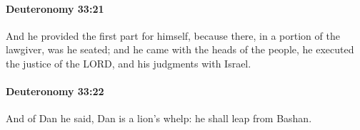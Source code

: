 		\paragraph{Deuteronomy 33:21} %
			\label{DEUTERONOMY-33-21}

			And he provided the first part for himself, because there, in a portion of the lawgiver, was he seated; and he came with the heads of the people, he executed the justice of the LORD, and his judgments with Israel.


		\paragraph{Deuteronomy 33:22} %
			\label{DEUTERONOMY-33-22}

			And of Dan he said, Dan is a lion's whelp: he shall leap from Bashan.


